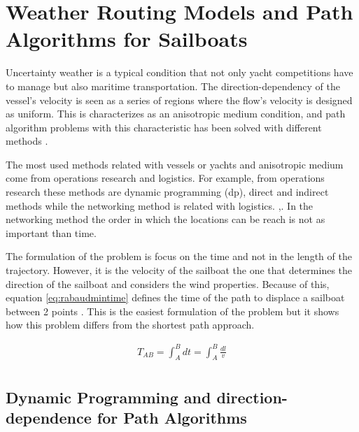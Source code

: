 \section{Weather Routing Models and Path Algorithms for Sailboats}\label{sec:weatherRoute}

Uncertainty weather is a typical condition that not only yacht competitions have to manage but also maritime transportation. The direction-dependency of the vessel's velocity is seen as a series of regions where the flow's velocity is designed as uniform. This is characterizes as an anisotropic medium condition, and path algorithm problems with this characteristic has been solved with different methods \cite{dolinskaya2013fastest}. \par 
\noindent 
The most used methods related with vessels or yachts and anisotropic medium come from operations research and logistics. For example, from operations research these methods are dynamic programming (\acrshort{dp}), direct and indirect methods while the networking method is related with logistics. \cite{kelly2015transcription},\cite{mitchell2000geometric}. In the networking method the order in which the locations can be reach is not as important than time. \par 
The formulation of the problem is focus on the time and not in the length of the trajectory. However, it is the velocity of the sailboat the one that determines the direction of the sailboat and considers the wind properties. Because of this, equation \ref{eq:rabaudmintime} defines the time of the path to displace a sailboat between 2 points \cite{rabaudoptimal}. This is the easiest formulation of the problem but it shows how this problem differs from the shortest path approach.  \par

\begin{equation} \label{eq:rabaudmintime}
\begin{aligned}
T_{AB}=\int_{A}^{B} dt=\int_{A}^{B} \frac{dl}{v}  \\
\end{aligned}
\end{equation}

\subsection{Dynamic Programming and direction-dependence for Path Algorithms} \label{sec:dynProg}

